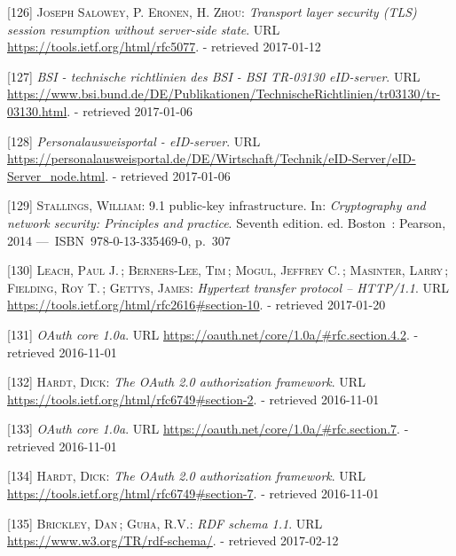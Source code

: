 \documentclass[12pt,english,a4paper,titlepage,cleardoublepage=empty,dottedtoc]{report}
\begin{document}
\hypertarget{ref-web_spec_tls-session-ticket-resumption}{}
{[}126{]} \textsc{Joseph Salowey, P. Eronen, \textnormal{H. Zhou}}:
\emph{Transport layer security (TLS) session resumption without
server-side state}. URL \url{https://tools.ietf.org/html/rfc5077}. -
retrieved 2017-01-12

\hypertarget{ref-web_bsi-spec_eid}{}
{[}127{]} \emph{BSI - technische richtlinien des BSI - BSI TR-03130
eID-server}. URL
\url{https://www.bsi.bund.de/DE/Publikationen/TechnischeRichtlinien/tr03130/tr-03130.html}.
- retrieved 2017-01-06

\hypertarget{ref-web_2017_npa-eid-server}{}
{[}128{]} \emph{Personalausweisportal - eID-server}. URL
\url{https://personalausweisportal.de/DE/Wirtschaft/Technik/eID-Server/eID-Server_node.html}.
- retrieved 2017-01-06

\hypertarget{ref-book_2014_chapter-10-5-asym-random-number-gen}{}
{[}129{]} \textsc{Stallings, William}: 9.1 public-key infrastructure.
In: \emph{Cryptography and network security: Principles and practice}.
Seventh edition. ed. Boston~: Pearson, 2014 ---~ISBN~978-0-13-335469-0,
p.~307

\hypertarget{ref-web_spec_http-error-codes}{}
{[}130{]} \textsc{Leach, Paul J.}\,; \textsc{Berners-Lee, Tim}\,;
\textsc{Mogul, Jeffrey C.}\,; \textsc{Masinter, Larry}\,;
\textsc{Fielding, Roy T.}\,; \textsc{Gettys, James}: \emph{Hypertext
transfer protocol -- HTTP/1.1}. URL
\url{https://tools.ietf.org/html/rfc2616\#section-10}. - retrieved
2017-01-20

\hypertarget{ref-web_spec_oauth-1a_client-reg}{}
{[}131{]} \emph{OAuth core 1.0a}. URL
\url{https://oauth.net/core/1.0a/\#rfc.section.4.2}. - retrieved
2016-11-01

\hypertarget{ref-web_spec_oauth-2_client-reg}{}
{[}132{]} \textsc{Hardt, Dick}: \emph{The OAuth 2.0 authorization
framework}. URL \url{https://tools.ietf.org/html/rfc6749\#section-2}. -
retrieved 2016-11-01

\hypertarget{ref-web_spec_oauth-1a_access-verification}{}
{[}133{]} \emph{OAuth core 1.0a}. URL
\url{https://oauth.net/core/1.0a/\#rfc.section.7}. - retrieved
2016-11-01

\hypertarget{ref-web_spec_oauth-2_access-verification}{}
{[}134{]} \textsc{Hardt, Dick}: \emph{The OAuth 2.0 authorization
framework}. URL \url{https://tools.ietf.org/html/rfc6749\#section-7}. -
retrieved 2016-11-01

\hypertarget{ref-web_w3c-tr_rdf-schemas}{}
{[}135{]} \textsc{Brickley, Dan}\,; \textsc{Guha, R.V.}: \emph{RDF
schema 1.1}. URL \url{https://www.w3.org/TR/rdf-schema/}. - retrieved
2017-02-12
\end{document}
